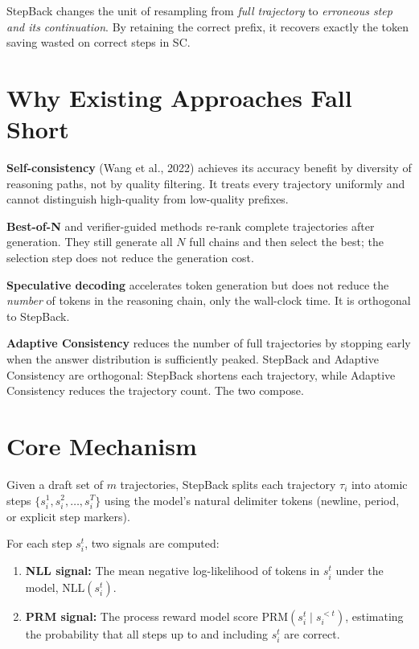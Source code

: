 \documentclass[10pt,twocolumn]{article}
\begin{document}
StepBack changes the unit of resampling from \emph{full trajectory} to
\emph{erroneous step and its continuation}. By retaining the correct
prefix, it recovers exactly the token saving wasted on correct steps
in SC.

\section{Why Existing Approaches Fall Short}

\textbf{Self-consistency} (Wang et al., 2022) achieves its accuracy
benefit by diversity of reasoning paths, not by quality filtering. It
treats every trajectory uniformly and cannot distinguish high-quality
from low-quality prefixes.

\textbf{Best-of-N} and verifier-guided methods re-rank complete
trajectories after generation. They still generate all $N$ full chains
and then select the best; the selection step does not reduce the
generation cost.

\textbf{Speculative decoding} accelerates token generation but does not
reduce the \emph{number} of tokens in the reasoning chain, only the
wall-clock time. It is orthogonal to StepBack.

\textbf{Adaptive Consistency} reduces the number of full trajectories
by stopping early when the answer distribution is sufficiently peaked.
StepBack and Adaptive Consistency are orthogonal: StepBack shortens
each trajectory, while Adaptive Consistency reduces the trajectory
count. The two compose.

\section{Core Mechanism}

Given a draft set of $m$ trajectories, StepBack splits each trajectory
$\tau_i$ into atomic steps $\{s_i^1, s_i^2, \ldots, s_i^T\}$ using the
model's natural delimiter tokens (newline, period, or explicit step
markers).

For each step $s_i^t$, two signals are computed:
\begin{enumerate}[itemsep=2pt,parsep=0pt]
  \item \textbf{NLL signal:} The mean negative log-likelihood of tokens
    in $s_i^t$ under the model, $\text{NLL}(s_i^t)$.
  \item \textbf{PRM signal:} The process reward model score
    $\text{PRM}(s_i^t \mid s_i^{<t})$, estimating the probability that
    all steps up to and including $s_i^t$ are correct.
\end{enumerate}
\end{document}
